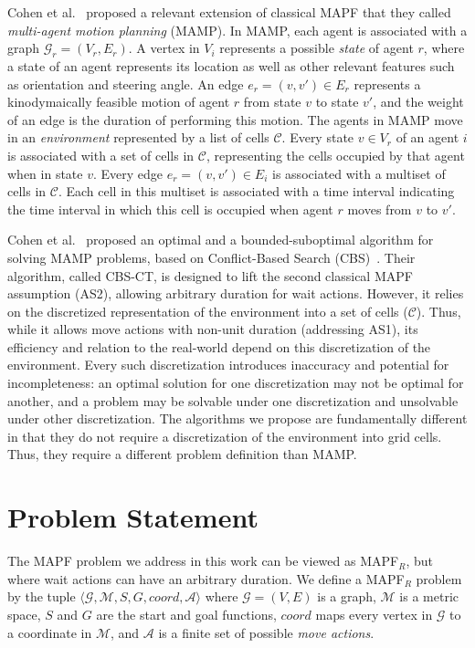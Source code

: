 \documentclass[review]{elsarticle}
\newcommand{\target}{\ensuremath{G}\xspace}
\newcommand{\source}{\ensuremath{S}\xspace}
\newcommand\konstantin[1]{\nb{\textbf{Konstantin:}}{red}{#1}}
\newcommand{\mapfr}{\ac{MAPF}$_R$\xspace}
\newcommand{\mapf}{\ac{MAPF}\xspace}
\newcommand{\coord}{\textit{coord}\xspace}
\begin{document}
Cohen et al.~\cite{cohen2019optimal} proposed a relevant extension of classical \mapf that they called \emph{multi-agent motion planning} (MAMP).  In MAMP, each agent is associated with a graph $\mathcal{G}_r=(V_r,E_r)$. 
A vertex in $V_i$ represents a possible \emph{state} of agent $r$, where a state of an agent represents its location as well as other relevant features such as orientation and steering angle. 
An edge $e_r=(v,v')\in E_r$ represents a kinodymaically feasible motion of agent $r$ from state $v$ to state $v'$, 
and the weight of an edge is the duration of performing this motion.
The agents in MAMP move in an \emph{environment} represented by a list of cells $\mathcal{C}$. 
Every state $v\in V_r$ of an agent $i$ is associated with a set of cells in $\mathcal{C}$, representing the cells occupied by that agent when in state $v$. 
Every edge $e_r=(v,v')\in E_i$ is associated with a multiset of cells in $\mathcal{C}$. 
Each cell in this multiset is associated with a time interval indicating the time interval in which this cell is occupied when agent $r$ moves from $v$ to $v'$.

Cohen et al.~\cite{cohen2019optimal} proposed an optimal and a bounded-suboptimal algorithm for solving MAMP problems, based on Conflict-Based Search (CBS)~\cite{sharon2015conflict}. Their algorithm, called CBS-CT, is designed to lift the second classical \mapf assumption (AS2), allowing arbitrary duration for wait actions. 
However, it relies on the discretized representation of the environment into a set of cells ($\mathcal{C}$). Thus, while it allows move actions with non-unit duration (addressing AS1), its efficiency and relation to the real-world depend on this discretization of the environment. Every such discretization introduces inaccuracy and potential for incompleteness: an optimal solution for one discretization may not be optimal for another, and a problem may be solvable under one discretization and unsolvable under other discretization.  
The algorithms we propose are fundamentally different in that they do not require a discretization of the environment into grid cells.  Thus, they require a different problem definition than MAMP. 


\section{Problem Statement}
\label{sec:problem-statement}
The \mapf problem we address in this work can be viewed as \mapfr, but where wait actions can have an arbitrary duration.  
We define a \mapfr problem by the tuple $\langle \mathcal{G}, \mathcal{M}, \source, \target, \coord, \mathcal{A}\rangle$ 
where $\mathcal{G}=(V,E)$ is a graph, 
$\mathcal{M}$ is a metric space, 
$\source$ and $\target$ are the start and goal functions, 
$\coord$ maps every vertex in $\mathcal{G}$ to a coordinate in $\mathcal{M}$, 
and $\mathcal{A}$ is a finite set of possible \emph{move actions}.
\end{document}
